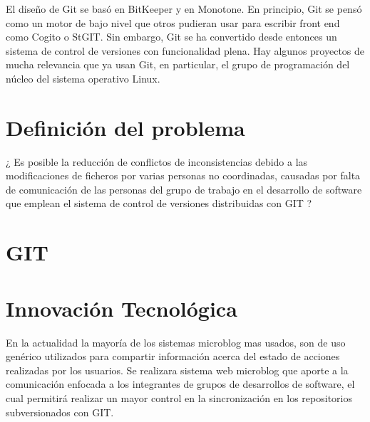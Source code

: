 \documentclass[letterpaper, 12pt,double,graphicx,caption,rotating]{report}
\begin{document}
El diseño de Git se basó en BitKeeper y en Monotone. En principio, Git se pensó como un motor de bajo nivel que otros pudieran usar para escribir front end como Cogito o StGIT. Sin embargo, Git se ha convertido desde entonces un sistema de control de versiones con funcionalidad plena. Hay algunos proyectos de mucha relevancia que ya usan Git, en particular, el grupo de programación del núcleo del sistema operativo Linux.

\section{Definición del problema}
¿ Es posible la reducción de conflictos de inconsistencias debido a las modificaciones de ficheros por varias personas no coordinadas,  causadas por falta de comunicación de las personas del grupo de trabajo en el desarrollo de software que emplean el sistema de control de versiones distribuidas con GIT ?

\section{GIT}

\section{Innovación Tecnológica}
En la actualidad la mayoría de los sistemas microblog mas usados, son de uso genérico utilizados para compartir información acerca del estado de acciones realizadas por los usuarios. Se realizara sistema web microblog que aporte a la comunicación enfocada a los integrantes de grupos de desarrollos de software, el cual permitirá realizar un mayor control en la sincronización en los repositorios subversionados con GIT.

\end{document}
